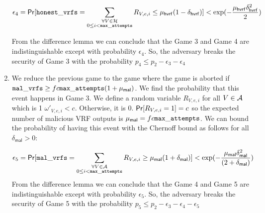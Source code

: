 \begin{enumerate}[label={{Game }}{{\arabic*}}]
	\begin{equation}\label{eq:beforeepcoh}
	\epsilon_4 = \mathsf{Pr}[ \mathtt{honest\_vrfs} = \sum_{\substack{ \forall V \in \mathcal{H} \\0\leq i < \mathtt{max\_attempts}}} R_{V,e,i} \leq \mu_{\mathsf{hvrf}} (1 - \delta_{\mathsf{hvrf}})] < \exp(-\frac{\mu_{\mathsf{hvrf}}\delta_{\mathsf{hvrf}}^2}{2}) \nonumber
	\end{equation}
	
	From the difference lemma we can conclude that the Game 3 and Game 4 are indistinguishable except with probability $ \epsilon_4 $. So, the adversary breaks the security of Game 3 with the probability $ p_4 \leq p_2 - \epsilon_3  - \epsilon_4$       
	
	\item We reduce the previous game to the game where the game is aborted if $ \mathtt{mal\_vrfs} \geq fc \mathtt{max\_attempts} (1+\mu_{\mathsf{mal}}) $. We find the probability that this event happens in Game 3.
	We define a random variable $ R_{V,e,i} $ for all $ V \in \mathcal{A} $ which is 1 $ \omega'_{V,e,i} < c $. Otherwise, it is 0.  $ \mathsf{Pr}[R_{V,e,i} = 1] = c $ so the expected number of malicious VRF outputs  is $ \mu_{\mathsf{mal}} = fc\mathtt{max\_attempts}  $. We can bound the probability of having this event with the Chernoff bound as follows for all $ \delta_{\mathsf{mal}} > 0 	 $:
	
	\begin{equation}\label{eq:malvrf}
	\epsilon_5 = \mathsf{Pr}[ \mathtt{mal\_vrfs} = \sum_{\substack{ \forall V \in \mathcal{A} \\0\leq i < \mathtt{max\_attempts}}} R_{V,e,i} \geq \mu_{\mathsf{mal}} (1+ \delta_{\mathsf{mal}})] < \exp(-\frac{\mu_{\mathsf{mal}}\delta_{\mathsf{mal}}^2}{(2+\delta_{\mathsf{mal}})}) \nonumber
	\end{equation}                                                                                                                                                                                                                                                                                            From the difference lemma we can conclude that the Game 4 and Game 5 are indistinguishable except with probability $ \epsilon_5 $. So, the adversary breaks the security of Game 5 with the probability $ p_5 \leq p_2 - \epsilon_3  - \epsilon_4 - \epsilon_5$                                                         
	

	
	

\end{enumerate}
